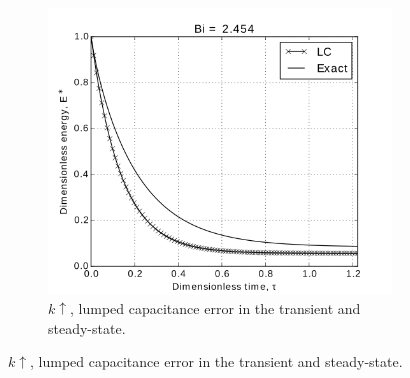 \begin{figure}
        \centering
        \begin{subfigure}[b]{0.5\textwidth}
                \includegraphics[width=\textwidth]{figures/LC-analytic-sphere-in-fluid-Bi-2a}
                \caption{$k \uparrow$, lumped capacitance error in the transient and steady-state.}
				\label{fig:LC-analytic-sphere-in-fluid-Bi-2a}
        \end{subfigure}%
        

\end{figure}
